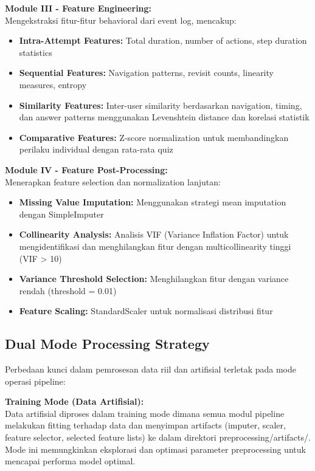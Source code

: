 \textbf{Module III - Feature Engineering:} \\
Mengekstraksi fitur-fitur behavioral dari event log, mencakup:
\begin{itemize}
    \item \textbf{Intra-Attempt Features:} Total duration, number of actions, step duration statistics
    \item \textbf{Sequential Features:} Navigation patterns, revisit counts, linearity measures, entropy
    \item \textbf{Similarity Features:} Inter-user similarity berdasarkan navigation, timing, dan answer patterns menggunakan Levenshtein distance dan korelasi statistik
    \item \textbf{Comparative Features:} Z-score normalization untuk membandingkan perilaku individual dengan rata-rata quiz
\end{itemize}

\textbf{Module IV - Feature Post-Processing:} \\
Menerapkan feature selection dan normalization lanjutan:
\begin{itemize}
    \item \textbf{Missing Value Imputation:} Menggunakan strategi mean imputation dengan SimpleImputer
    \item \textbf{Collinearity Analysis:} Analisis VIF (Variance Inflation Factor) untuk mengidentifikasi dan menghilangkan fitur dengan multicollinearity tinggi (VIF > 10)
    \item \textbf{Variance Threshold Selection:} Menghilangkan fitur dengan variance rendah (threshold = 0.01)
    \item \textbf{Feature Scaling:} StandardScaler untuk normalisasi distribusi fitur
\end{itemize}

\subsection{Dual Mode Processing Strategy}
\label{sec:dualModeProcessingStrategy}

Perbedaan kunci dalam pemrosesan data riil dan artifisial terletak pada mode operasi pipeline:

\textbf{Training Mode (Data Artifisial):} \\
Data artifisial diproses dalam training mode dimana semua modul pipeline melakukan fitting terhadap data dan menyimpan artifacts (imputer, scaler, feature selector, selected feature lists) ke dalam direktori preprocessing/artifacts/. Mode ini memungkinkan eksplorasi dan optimasi parameter preprocessing untuk mencapai performa model optimal.

